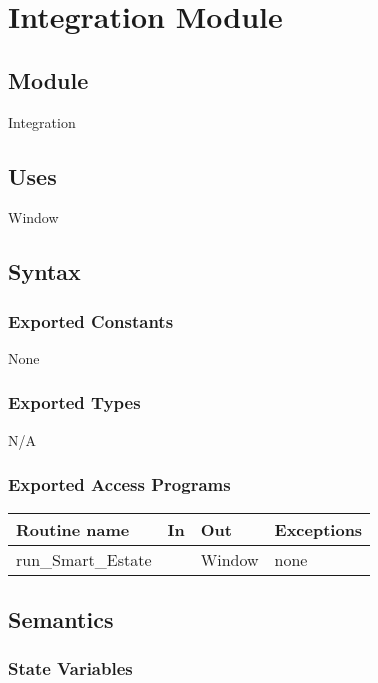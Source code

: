 \documentclass[12pt]{article}
\begin{document}
\newpage

\section* {Integration Module}

\subsection*{Module}

Integration

\subsection* {Uses}

Window

\subsection* {Syntax}

\subsubsection* {Exported Constants}

None

\subsubsection* {Exported Types}

N/A

\subsubsection* {Exported Access Programs}

\begin{tabular}{| l | l | l | p{5cm} |}
\hline
\textbf{Routine name} & \textbf{In} & \textbf{Out} & \textbf{Exceptions}\\
\hline
run\_Smart\_Estate &   & Window & none\\
\hline
\end{tabular}

\subsection* {Semantics}

\subsubsection* {State Variables}
\end{document}
